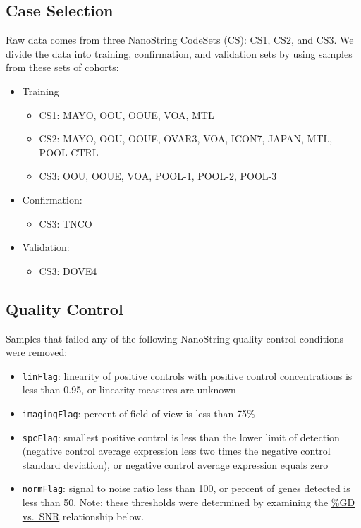 \documentclass[
]{report}
\providecommand{\tightlist}{%
  \setlength{\itemsep}{0pt}\setlength{\parskip}{0pt}}
\begin{document}
\subsection{Case Selection}\label{case-selection}

Raw data comes from three NanoString CodeSets (CS): CS1, CS2, and CS3. We divide the data into training, confirmation, and validation sets by using samples from these sets of cohorts:

\begin{itemize}
\tightlist
\item
  Training

  \begin{itemize}
  \tightlist
  \item
    CS1: MAYO, OOU, OOUE, VOA, MTL
  \item
    CS2: MAYO, OOU, OOUE, OVAR3, VOA, ICON7, JAPAN, MTL, POOL-CTRL
  \item
    CS3: OOU, OOUE, VOA, POOL-1, POOL-2, POOL-3
  \end{itemize}
\item
  Confirmation:

  \begin{itemize}
  \tightlist
  \item
    CS3: TNCO
  \end{itemize}
\item
  Validation:

  \begin{itemize}
  \tightlist
  \item
    CS3: DOVE4
  \end{itemize}
\end{itemize}

\subsection{Quality Control}\label{quality-control}

Samples that failed any of the following NanoString quality control conditions were removed:

\begin{itemize}
\tightlist
\item
  \texttt{linFlag}: linearity of positive controls with positive control concentrations is less than 0.95, or linearity measures are unknown
\item
  \texttt{imagingFlag}: percent of field of view is less than 75\%
\item
  \texttt{spcFlag}: smallest positive control is less than the lower limit of detection (negative control average expression less two times the negative control standard deviation), or negative control average expression equals zero
\item
  \texttt{normFlag}: signal to noise ratio less than 100, or percent of genes detected is less than 50. Note: these thresholds were determined by examining the \hyperref[gd-vs.-snr]{\%GD vs.~SNR} relationship below.
\end{itemize}
\end{document}

